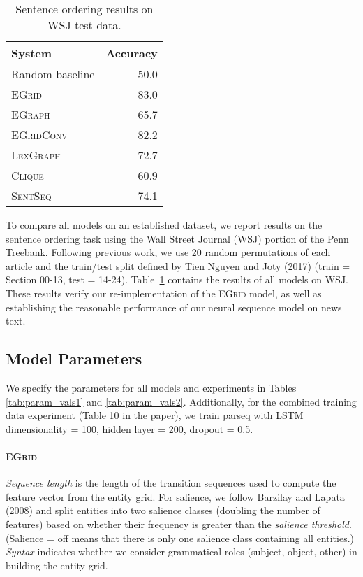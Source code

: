 \documentclass[11pt,a4paper]{article}
\newcommand \egrid{\textsc{EGrid}\xspace}
\newcommand \egraph{\textsc{EGraph}\xspace}
\newcommand \lexgraph{\textsc{LexGraph}\xspace}
\newcommand \sentseq{\textsc{SentSeq}\xspace}
\newcommand \clique{\textsc{Clique}\xspace}
\newcommand \egridconv{\textsc{EGridConv}\xspace}
\begin{document}
\begin{table}
\begin{center}
 \begin{small}
\begin{tabular}{lr}
	\toprule
System & Accuracy \\	
	\midrule
    Random baseline & 50.0 \\
    \midrule
	\egrid & 83.0 \\
    \egraph & 65.7 \\
    \egridconv & 82.2\\
    \lexgraph & 72.7 \\
    \clique & 60.9 \\
    \sentseq & 74.1 \\
	\bottomrule
\end{tabular}
\end{small}
\caption{Sentence ordering results on WSJ test data.}
\label{tab:wsj_perm_test}
\end{center}
\end{table}

To compare all models on an established dataset, we report results on the sentence ordering task using the Wall Street Journal (WSJ) portion of the Penn Treebank. Following previous work, we use 20 random permutations of each article and the train/test split defined by Tien Nguyen and Joty (2017) (train = Section 00-13, test = 14-24). Table~\ref{tab:wsj_perm_test} contains the results of all models on WSJ. These results verify our re-implementation of the \egrid model, as well as establishing the reasonable performance of our neural sequence model on news text.





\subsection{Model Parameters}

We specify the parameters for all models and experiments in Tables \ref{tab:param_vals1} and \ref{tab:param_vals2}. Additionally, for the combined training data experiment (Table 10 in the paper), we train parseq with LSTM dimensionality = 100, hidden layer = 200, dropout = 0.5. 

\paragraph{\egrid} \textit{Sequence length} is the length of the transition sequences used to compute the feature vector from the entity grid. For salience, we follow Barzilay and Lapata (2008) and split entities into two salience classes (doubling the number of features) based on whether their frequency is greater than the \textit{salience threshold}. (Salience = off means that there is only one salience class containing all entities.) \textit{Syntax} indicates whether we consider grammatical roles (subject, object, other) in building the entity grid.
\end{document}
